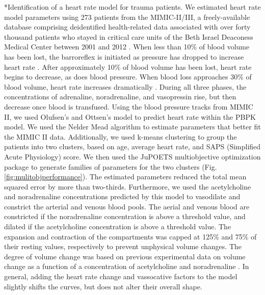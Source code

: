 \documentclass[11pt]{article}
\makeatletter
\renewcommand\paragraph{\@startsection
  {paragraph}{2}{0mm}
  {-0.05in}
  {-0.5\baselineskip}
  {\normalfont\normalsize\itshape}}
\makeatother
\begin{document}
\paragraph*{Identification of a heart rate model for trauma patients.}
We estimated heart rate model parameters using 273 patients from the MIMIC-II/III, a freely-available database comprising deidentified health-related data associated with
over forty thousand patients who stayed in critical care units of the Beth Israel Deaconess Medical Center between 2001 and 2012 \cite{Johnson:2016aa}.
When less than 10\% of blood volume has been lost, the barroreflex is initiated as pressure has dropped to increase heart rate \cite{foex1999systemic}.
After approximately 10\% of blood volume has been lost, heart rate begins to decrease, as does blood pressure.
When blood loss approaches 30\% of blood volume, heart rate increases dramatically \cite{jacobsen1990cardiovascular}.
During all three phases, the concentrations of adrenaline, noradrenaline, and vasopressin rise, but then decrease once blood is transfused.
Using the blood pressure tracks from MIMIC II, we used Olufsen's and Ottsen's model \cite{olufsen2013practical} to predict heart rate within the PBPK model.
We used the Nelder Mead algorithm to estimate parameters that better fit the MIMIC II data.
Additionally, we used k-means clustering to group the patients into two clusters, based on age, average heart rate, and SAPS (Simplified Acute Physiology) score.
We then used the JuPOETS multiobjective optimization package \cite{bassen2016jupoets} to generate families of parameters for the two clusters (Fig. \ref{fig:mulitobjperformance}).
The estimated parameters reduced the total mean squared error by more than two-thirds. Furthermore, we used the acetylcholine and noradrenaline concentrations predicted by this model to vasodilate and constrict the arterial and venous blood pools. The aerial and venous blood are constricted if the noradrenaline concentration is above a threshold value, and dilated if the acetylcholine concentration is above a threshold value. The expansion and contraction of the compartments was capped at 125\% and 75\% of their resting values, respectively to prevent unphysical volume changes. The degree of volume change was based on previous experimental data on volume change as a function of a concentration of acetylcholine and noradrenaline \cite{chowienczyk1994blood,dora1983effect}.
In general, adding the heart rate change and vassocative factors to the model slightly shifts the curves, but does not alter their overall shape.
\end{document}
